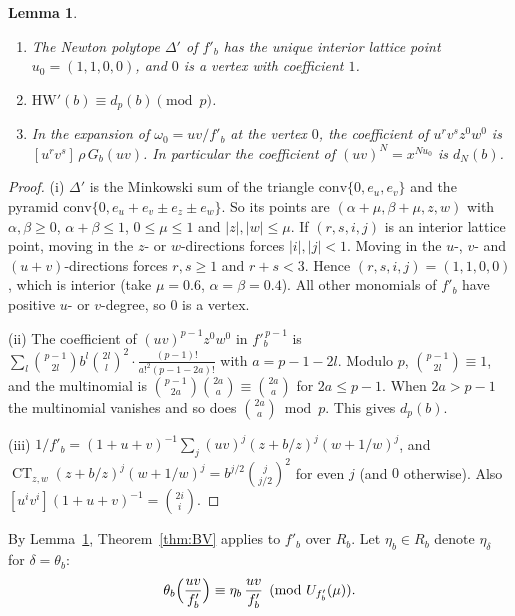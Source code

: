 \documentclass[11pt]{amsart}
\newtheorem{lemma}[theorem]{Lemma}
\theoremstyle{definition}
\theoremstyle{remark}
\newcommand{\CT}{\operatorname{CT}}
\begin{document}
\begin{lemma}\label{lem:polytopeB}
\begin{enumerate}[label=(\roman*)]
\item The Newton polytope $\Delta'$ of $f'_b$ has the unique interior lattice point $u_0=(1,1,0,0)$,
and $0$ is a vertex with coefficient $1$.
\item $\mathrm{HW}'(b)\equiv d_p(b)\pmod p$.
\item In the expansion of $\omega_0=uv/f'_b$ at the vertex $0$, the coefficient of
$u^rv^sz^0w^0$ is $[u^rv^s]\,\rho\,G_b(uv)$. In particular the coefficient of
$(uv)^N=x^{Nu_0}$ is $d_N(b)$.
\end{enumerate}
\end{lemma}
\begin{proof}
(i) $\Delta'$ is the Minkowski sum of the triangle $\mathrm{conv}\{0,e_u,e_v\}$ and the pyramid
$\mathrm{conv}\{0,e_u+e_v\pm e_z\pm e_w\}$. So its points are $(\alpha+\mu,\beta+\mu,z,w)$ with
$\alpha,\beta\ge0$, $\alpha+\beta\le1$, $0\le\mu\le1$ and $|z|,|w|\le\mu$. If $(r,s,i,j)$ is an
interior lattice point, moving in the $z$- or $w$-directions forces $|i|,|j|<1$. Moving in the
$u$-, $v$- and $(u+v)$-directions forces $r,s\ge1$ and $r+s<3$. Hence $(r,s,i,j)=(1,1,0,0)$, which
is interior (take $\mu=0.6$, $\alpha=\beta=0.4$). All other monomials of $f'_b$ have positive
$u$- or $v$-degree, so $0$ is a vertex.

(ii) The coefficient of $(uv)^{p-1}z^0w^0$ in $f'^{\,p-1}_b$ is
$\sum_l\binom{p-1}{2l}b^l\binom{2l}l^2\cdot\frac{(p-1)!}{a!^2(p-1-2a)!}$ with $a=p-1-2l$. Modulo $p$,
$\binom{p-1}{2l}\equiv1$, and the multinomial is $\binom{p-1}{2a}\binom{2a}a\equiv\binom{2a}a$ for
$2a\le p-1$. When $2a>p-1$ the multinomial vanishes and so does $\binom{2a}a\bmod p$. This gives
$d_p(b)$.

(iii) $1/f'_b=(1+u+v)^{-1}\sum_j(uv)^j(z+b/z)^j(w+1/w)^j$, and
$\CT_{z,w}(z+b/z)^j(w+1/w)^j=b^{j/2}\binom j{j/2}^2$ for even $j$ (and $0$ otherwise). Also
$[u^iv^i](1+u+v)^{-1}=\binom{2i}i$.
\end{proof}

By Lemma~\ref{lem:polytopeB}, Theorem~\ref{thm:BV} applies to $f'_b$ over $R_b$. Let
$\eta_b\in R_b$ denote $\eta_\delta$ for $\delta=\theta_b$:
\begin{equation}\label{eq:etab}
 \theta_b\Bigl(\frac{uv}{f'_b}\Bigr)\equiv\eta_b\,\frac{uv}{f'_b}\pmod{U_{f'_b}(\mu)} .
\end{equation}
\end{document}
